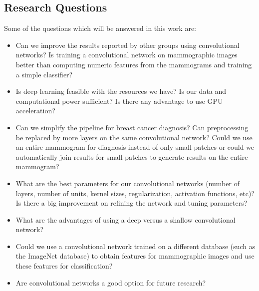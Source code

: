 \subsection{Research Questions}
Some of the questions which will be answered in this work are:
\begin{itemize} 
	\item Can we improve the results reported by other groups using convolutional networks? Is training a convolutional network on mammographic images better than computing numeric features from the mammograms and training a simple classifier?
	\item Is deep learning feasible with the resources we have? Is our data and computational power sufficient? Is there any advantage to use GPU acceleration?
	\item Can we simplify the pipeline for breast cancer diagnosis? Can preprocessing be replaced by more layers on the same convolutional network? Could we use an entire mammogram for diagnosis instead of only small patches or could we automatically join results for small patches to generate results on the entire mammogram?
	\item What are the best parameters for our convolutional networks (number of layers, number of units, kernel sizes, regularization, activation functions, etc)? Is there a big improvement on refining the network and tuning parameters?
	\item What are the advantages of using a deep versus a shallow convolutional network? 
	\item Could we use a convolutional network trained on a different database (such as the ImageNet database) to obtain features for mammographic images and use these features for classification?
	\item Are convolutional networks a good option for future research?
\end{itemize}

\begin{comment}
Las {\it Hipótesis}, que de acuerdo a Sampieri {\it indican lo que estamos
  buscando 
o tratando de probar y pueden definirse como explicaciones tentativas del
fenómeno investigado y formuladas a manera de proposiciones}. Las hipótesis
surgen normalmente de los {\it Objetivos} y proponen contestar tentativamente
  las preguntas de investigación.

{\bf Las preguntas de investigación se incluyen aquí ......}
\end{comment}
